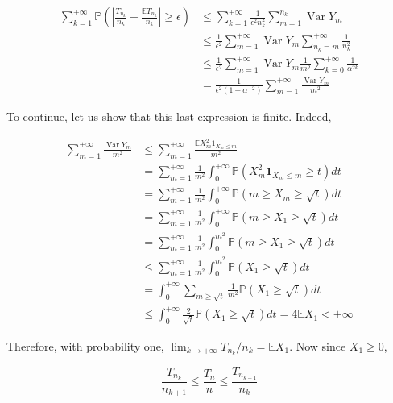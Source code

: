 \documentclass[11pt]{amsbook}
\theoremstyle{plain}%
\theoremstyle{definition}
\theoremstyle{remark}
\begin{document}
$$
\begin{aligned}
\sum_{k=1}^{+\infty} \mathbb{P}\left(\left|\frac{T_{n_{k}}}{n_{k}}-\frac{\mathbb{E} T_{n_{k}}}{n_{k}}\right| \geq \epsilon\right) & \leq \sum_{k=1}^{+\infty} \frac{1}{\epsilon^{2} n_{k}^{2}} \sum_{m=1}^{n_{k}} \operatorname{Var} Y_{m} \\
& \leq \frac{1}{\epsilon^{2}} \sum_{m=1}^{+\infty} \operatorname{Var} Y_{m} \sum_{n_{k}=m}^{+\infty} \frac{1}{n_{k}^{2}} \\
& \leq \frac{1}{\epsilon^{2}} \sum_{m=1}^{+\infty} \operatorname{Var} Y_{m} \frac{1}{m^{2}} \sum_{k=0}^{+\infty} \frac{1}{\alpha^{2 k}} \\
& =\frac{1}{\epsilon^{2}\left(1-\alpha^{-2}\right)} \sum_{m=1}^{+\infty} \frac{\operatorname{Var} Y_{m}}{m^{2}}
\end{aligned}
$$

To continue, let us show that this last expression is finite. Indeed,

$$
\begin{aligned}
\sum_{m=1}^{+\infty} \frac{\operatorname{Var} Y_{m}}{m^{2}} & \leq \sum_{m=1}^{+\infty} \frac{\mathbb{E} X_{m}^{2} 1_{X_{m} \leq m}}{m^{2}} \\
& =\sum_{m=1}^{+\infty} \frac{1}{m^{2}} \int_{0}^{+\infty} \mathbb{P}\left(X_{m}^{2} \mathbf{1}_{X_{m} \leq m} \geq t\right) d t \\
& =\sum_{m=1}^{+\infty} \frac{1}{m^{2}} \int_{0}^{+\infty} \mathbb{P}\left(m \geq X_{m} \geq \sqrt{t}\right) d t \\
& =\sum_{m=1}^{+\infty} \frac{1}{m^{2}} \int_{0}^{+\infty} \mathbb{P}\left(m \geq X_{1} \geq \sqrt{t}\right) d t \\
& =\sum_{m=1}^{+\infty} \frac{1}{m^{2}} \int_{0}^{m^{2}} \mathbb{P}\left(m \geq X_{1} \geq \sqrt{t}\right) d t \\
& \leq \sum_{m=1}^{+\infty} \frac{1}{m^{2}} \int_{0}^{m^{2}} \mathbb{P}\left(X_{1} \geq \sqrt{t}\right) d t \\
& =\int_{0}^{+\infty} \sum_{m \geq \sqrt{t}} \frac{1}{m^{2}} \mathbb{P}\left(X_{1} \geq \sqrt{t}\right) d t \\
& \leq \int_{0}^{+\infty} \frac{2}{\sqrt{t}} \mathbb{P}\left(X_{1} \geq \sqrt{t}\right) d t=4 \mathbb{E} X_{1}<+\infty
\end{aligned}
$$

Therefore, with probability one, $\lim _{k \rightarrow+\infty} T_{n_{k}} / n_{k}=\mathbb{E} X_{1}$. Now since $X_{1} \geq 0$,

$$
\frac{T_{n_{k}}}{n_{k+1}} \leq \frac{T_{n}}{n} \leq \frac{T_{n_{k+1}}}{n_{k}}
$$
\end{document}
